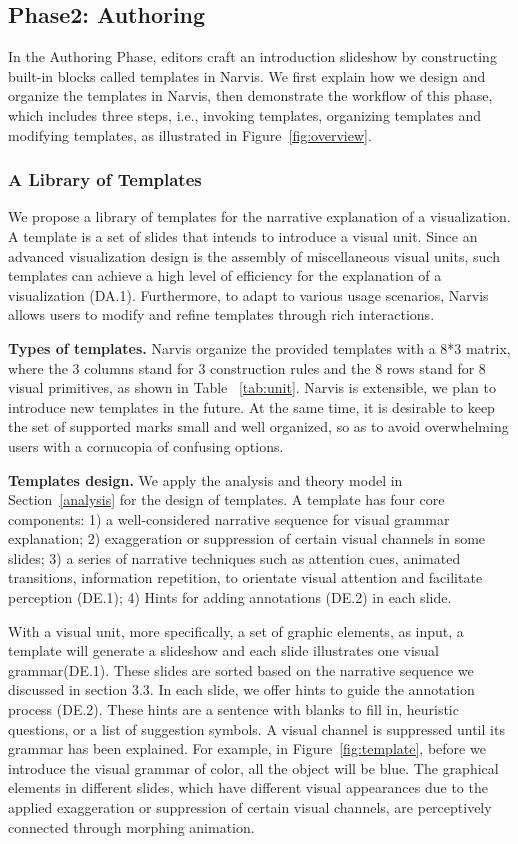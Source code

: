 \subsection{Phase2: Authoring}
In the Authoring Phase, editors craft an introduction slideshow by constructing built-in blocks called templates in Narvis. We first explain how we design and organize the templates in Narvis, then demonstrate the workflow of this phase, which includes three steps, i.e., invoking templates, organizing templates and modifying templates, as illustrated in Figure~\ref{fig:overview}. 

\subsubsection{A Library of Templates}
We propose a library of templates for the narrative explanation of a visualization. A template is a set of slides that intends to introduce a visual unit. Since an advanced visualization design is the assembly of miscellaneous visual units, such templates can achieve a high level of efficiency for the explanation of a visualization (DA.1). Furthermore, to adapt to various usage scenarios, Narvis allows users to modify and refine templates through rich interactions.


\textbf{Types of templates.}
Narvis organize the provided templates with a 8*3 matrix, where the 3 columns stand for 3 construction rules and the 8 rows stand for  8 visual primitives, as shown in Table ~\ref{tab:unit}. Narvis is extensible, we plan to introduce new templates in the future. At the same time, it is desirable to keep the set of supported marks small and well organized, so as to avoid overwhelming users with a cornucopia of confusing options.


\textbf{Templates design.}
We apply the analysis and theory model in Section~\ref{analysis} for the design of templates. A template has four core components: 1) a well-considered narrative sequence for visual grammar explanation; 2) exaggeration or suppression of certain visual channels in some slides; 3) a series of narrative techniques such as attention cues, animated transitions, information repetition, to orientate visual attention and facilitate perception (DE.1); 4) Hints for adding annotations (DE.2) in each slide. 

With a visual unit, more specifically, a set of graphic elements, as input, a template will generate a slideshow and each slide illustrates one visual grammar(DE.1). These slides are sorted based on the narrative sequence we discussed in section 3.3. In each slide, we offer hints to guide the annotation process (DE.2). These hints are a sentence with blanks to fill in, heuristic questions, or a list of suggestion symbols. A visual channel is suppressed until its grammar has been explained. For example, in Figure~\ref{fig:template}, before we introduce the visual grammar of color, all the object will be blue. The graphical elements in different slides, which have different visual appearances due to the applied exaggeration or suppression of certain visual channels, are perceptively connected through morphing animation. 

